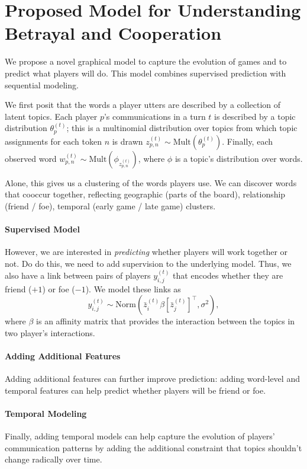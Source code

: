 \documentclass[11pt,letterpaper]{article}
\newcommand{\mult}[1]{\mbox{Mult}( #1)}
\newcommand{\norm}[2]{\mbox{Norm}\left(#1, #2\right)}
\begin{document}
\section{Proposed Model for Understanding Betrayal and Cooperation}

We propose a novel graphical model to capture the evolution of games
and to predict what players will do.  This model combines supervised
prediction with sequential modeling.

We first posit that the words a player utters are described by a
collection of latent topics.  Each player $p$'s communications in a
turn $t$ is described by a topic distribution $\theta^{(t)}_{p}$; this
is a multinomial distribution over topics from which topic assignments
for each token $n$ is drawn $z^{(t)}_{p,n} \sim
\mult{\theta^{(t)}_{p}}$.  Finally, each observed word $w^{(t)}_{p,n}
\sim \mult{\phi_{z^{(t)}_{p,n}}}$, where $\phi$ is a topic's
distribution over words.

Alone, this gives us a clustering of the words players use.  We can
discover words that cooccur together, reflecting geographic (parts of
the board), relationship (friend / foe), temporal (early game / late
game) clusters.

\paragraph{Supervised Model}

However, we are interested in \emph{predicting} whether players will
work together or not.  Do do this, we need to add supervision to the
underlying model.  Thus, we also have a link between pairs of players
$y^(t)_{i,j}$ that encodes whether they are friend ($+1$) or foe ($-1$).
We model these links as
\begin{equation}
y^{(t)}_{i,j} \sim \norm{\bar{z}^{(t)}_{i} \beta \left[ \bar{z}^{(t)}_{j}\right]^{\top}}{\sigma^2},
\end{equation}
where $\beta$ is an affinity matrix that provides the interaction
between the topics in two player's interactions.

\paragraph{Adding Additional Features}

Adding additional features can further improve prediction: adding
word-level and temporal features can help predict whether players will
be friend or foe.

\paragraph{Temporal Modeling}

Finally, adding temporal models can help capture the evolution of
players' communication patterns by adding the additional constraint
that topics shouldn't change radically over time.
\end{document}
